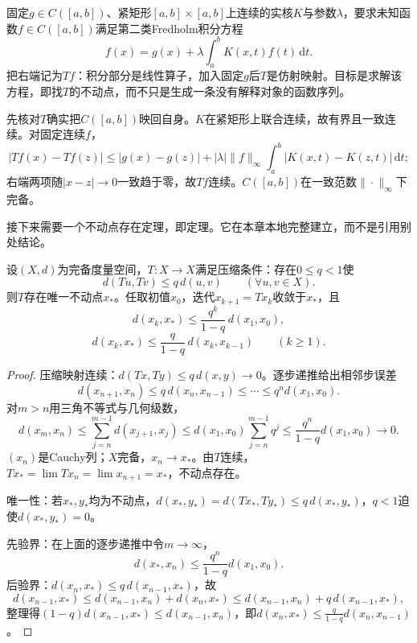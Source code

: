 固定$g\in C([a,b])$、紧矩形$[a,b]\times[a,b]$上连续的实核$K$与参数$\lambda$，要求未知函数$f\in C([a,b])$满足第二类Fredholm积分方程
\begin{equation}
\label{eq:functional-fredholm-equation}
f(x)=g(x)+\lambda\int_a^b K(x,t)f(t)\,\mathrm dt.
\end{equation}
把右端记为$Tf$：积分部分是线性算子，加入固定$g$后$T$是仿射映射。目标是求解该方程，即找$T$的不动点，而不只是生成一条没有解释对象的函数序列。

先核对$T$确实把$C([a,b])$映回自身。$K$在紧矩形上联合连续，故有界且一致连续。对固定连续$f$，
\[
|Tf(x)-Tf(z)|\le|g(x)-g(z)|+|\lambda|\|f\|_\infty\int_a^b|K(x,t)-K(z,t)|\,\mathrm dt;
\]
右端两项随$|x-z|\to0$一致趋于零，故$Tf$连续。$C([a,b])$在一致范数$\|\cdot\|_\infty$下完备。

接下来需要一个不动点存在定理，即定理。它在本章本地完整建立，而不是引用别处结论。

\begin{theorem}
\label{thm:banach-fixed-point}
设$(X,d)$为完备度量空间，$T:X\to X$满足压缩条件：存在$0\le q<1$使
\[
d(Tu,Tv)\le q\,d(u,v)\qquad(\forall u,v\in X).
\]
则$T$存在唯一不动点$x_*$。任取初值$x_0$，迭代$x_{k+1}=Tx_k$收敛于$x_*$，且
\begin{equation}
\label{eq:functional-iteration-apriori}
d(x_k,x_*)\le\frac{q^k}{1-q}\,d(x_1,x_0),
\end{equation}
\begin{equation}
\label{eq:functional-iteration-aposteriori}
d(x_k,x_*)\le\frac{q}{1-q}\,d(x_k,x_{k-1})\qquad(k\ge1).
\end{equation}
\end{theorem}

\begin{proof}
压缩映射连续：$d(Tx,Ty)\le q\,d(x,y)\to0$。逐步递推给出相邻步误差
\[
d(x_{n+1},x_n)\le q\,d(x_n,x_{n-1})\le\cdots\le q^n d(x_1,x_0).
\]
对$m>n$用三角不等式与几何级数，
\[
d(x_m,x_n)\le\sum_{j=n}^{m-1}d(x_{j+1},x_j)
\le d(x_1,x_0)\sum_{j=n}^{m-1}q^j
\le\frac{q^n}{1-q}d(x_1,x_0)\to0.
\]
$(x_n)$是Cauchy列；$X$完备，$x_n\to x_*$。由$T$连续，$Tx_*=\lim Tx_n=\lim x_{n+1}=x_*$，不动点存在。

唯一性：若$x_*,y_*$均为不动点，$d(x_*,y_*)=d(Tx_*,Ty_*)\le q\,d(x_*,y_*)$，$q<1$迫使$d(x_*,y_*)=0$。

先验界：在上面的逐步递推中令$m\to\infty$，
\[
d(x_*,x_n)\le\frac{q^n}{1-q}d(x_1,x_0).
\]
后验界：$d(x_n,x_*)\le q\,d(x_{n-1},x_*)$，故
\[
d(x_{n-1},x_*)\le d(x_{n-1},x_n)+d(x_n,x_*)\le d(x_{n-1},x_n)+q\,d(x_{n-1},x_*),
\]
整理得$(1-q)d(x_{n-1},x_*)\le d(x_{n-1},x_n)$，即$d(x_n,x_*)\le\frac{q}{1-q}d(x_n,x_{n-1})$。
\end{proof}

